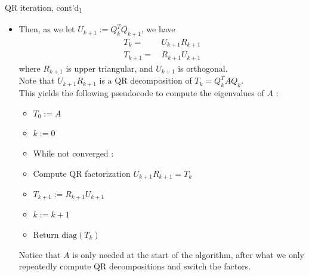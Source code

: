 \documentclass[t,usepdftitle=false]{beamer}
\begin{document}
\begin{frame}{QR iteration, cont'd\textsubscript{1}}
\begin{itemize}
\item[]Then, as we let $U_{k+1}:=Q_k^TQ_{k+1}$, we have
\begin{align*}
T_k=&\,U_{k+1}R_{k+1}\\
T_{k+1}=&\,R_{k+1}U_{k+1}
\end{align*}
where $R_{k+1}$ is upper triangular, and $U_{k+1}$ is orthogonal.\vspace{.1cm}\\
Note that $U_{k+1}R_{k+1}$ is a QR decomposition of $T_k=Q_k^TAQ_k$.\vspace{.1cm}\\
This yields the following pseudocode to compute the eigenvalues of $A$ :\vspace{.2cm}
\begin{itemize}
\item[1.] $T_0:=A$\vspace{.07cm}
\item[2.] $k:=0$\vspace{.07cm}
\item[3.] While not converged :\vspace{.07cm}
\item[4.]\hspace{.4cm}Compute QR factorization $U_{k+1}R_{k+1}=T_k$\vspace{.07cm}
\item[5.]\hspace{.4cm}$T_{k+1}:=R_{k+1}U_{k+1}$\vspace{.07cm}
\item[6.]\hspace{.4cm}$k:=k+1$\vspace{.07cm}
\item[7.] Return $\mathrm{diag}(T_k)$\vspace{.2cm}
\end{itemize}
Notice that $A$ is only needed at the start of the algorithm, after what we only repeatedly compute QR decompositions and switch the factors.
\end{itemize}
\end{frame}
\end{document}
